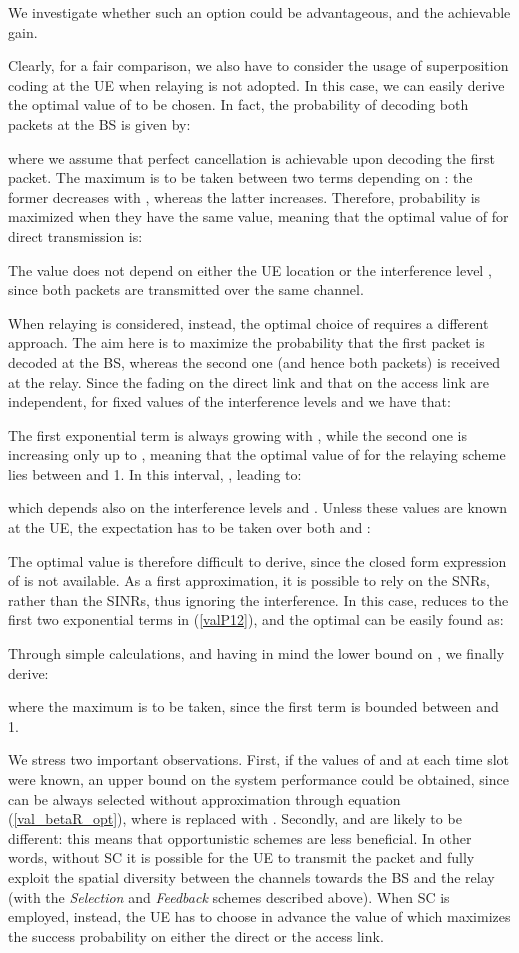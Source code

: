 \documentclass[12pt, letterpaper, onecolumn, draftcls]{IEEEtran}
\begin{document}
We investigate whether such an option could be advantageous, and the achievable gain.

Clearly, for a fair comparison, we also have to consider the usage of superposition coding at the UE when relaying is not adopted. In this case, we can easily derive the optimal value of  to be chosen. In fact, the probability of decoding both packets at the BS is given by:

where we assume that perfect cancellation is achievable upon decoding the first packet. The maximum is to be taken between two terms depending on : the former decreases with , whereas the latter increases. Therefore, probability  is maximized when they have the same value, meaning that the optimal value of  for direct transmission is:


The value  does not depend on either the UE location or the interference level , since both packets are transmitted over the same channel.

When relaying is considered, instead, the optimal choice of  requires a different approach. The aim here is to maximize the probability that the first packet is decoded at the BS, whereas the second one (and hence both packets) is received at the relay. Since the fading on the direct link and that on the access link are independent, for fixed values of the interference levels  and  we have that:


The first exponential term is always growing with , while the second one is increasing only up to , meaning that the optimal value of  for the relaying scheme lies between  and 1. In this interval, , leading to:

which depends also on the interference levels  and . Unless these values are known at the UE, the expectation has to be taken over both  and :


The optimal value  is therefore difficult to derive, since the closed form expression of  is not available. As a first approximation, it is possible to rely on the SNRs, rather than the SINRs, thus ignoring the interference. In this case,  reduces to the first two exponential terms in (\ref{valP12}), and the optimal  can be easily found as:

Through simple calculations, and having in mind the lower bound on , we finally derive:

where the maximum is to be taken, since the first term is bounded between  and 1.

We stress two important observations. First, if the values of  and  at each time slot were known, an upper bound on the system performance could be obtained, since  can be always selected without approximation through equation (\ref{val_betaR_opt}), where  is replaced with . Secondly,  and  are likely to be different: this means that opportunistic schemes are less beneficial. In other words, without SC it is possible for the UE to transmit the packet and fully exploit the spatial diversity between the channels towards the BS and the relay (with the \textit{Selection} and \textit{Feedback} schemes described above).
When SC is employed, instead, the UE has to choose in advance the value of  which maximizes the success probability on either the direct or the access link.
\end{document}
